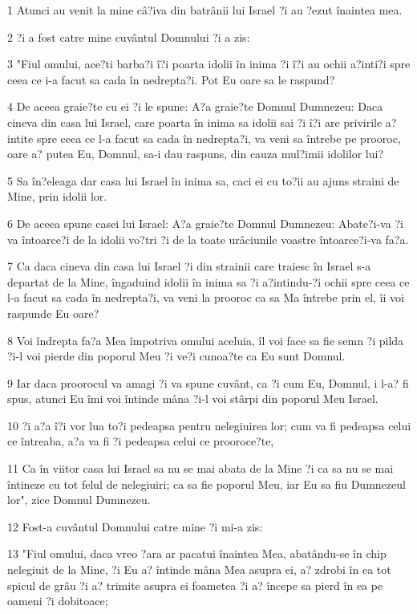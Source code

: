 \par 1 Atunci au venit la mine câ?iva din batrânii lui Israel ?i au ?ezut înaintea mea.
\par 2 ?i a fost catre mine cuvântul Domnului ?i a zis:
\par 3 "Fiul omului, ace?ti barba?i î?i poarta idolii în inima ?i î?i au ochii a?inti?i spre ceea ce i-a facut sa cada în nedrepta?i. Pot Eu oare sa le raspund?
\par 4 De aceea graie?te cu ei ?i le spune: A?a graie?te Domnul Dumnezeu: Daca cineva din casa lui Israel, care poarta în inima sa idolii sai ?i î?i are privirile a?intite spre ceea ce l-a facut sa cada în nedrepta?i, va veni sa întrebe pe prooroc, oare a? putea Eu, Domnul, sa-i dau raspuns, din cauza mul?imii idolilor lui?
\par 5 Sa în?eleaga dar casa lui Israel în inima sa, caci ei cu to?ii au ajuns straini de Mine, prin idolii lor.
\par 6 De aceea spune casei lui Israel: A?a graie?te Domnul Dumnezeu: Abate?i-va ?i va întoarce?i de la idolii vo?tri ?i de la toate urâciunile voastre întoarce?i-va fa?a.
\par 7 Ca daca cineva din casa lui Israel ?i din strainii care traiesc în Israel s-a departat de la Mine, îngaduind idolii în inima sa ?i a?intindu-?i ochii spre ceea ce l-a facut sa cada în nedrepta?i, va veni la prooroc ca sa Ma întrebe prin el, îi voi raspunde Eu oare?
\par 8 Voi îndrepta fa?a Mea împotriva omului aceluia, îl voi face sa fie semn ?i pilda ?i-l voi pierde din poporul Meu ?i ve?i cunoa?te ca Eu sunt Domnul.
\par 9 Iar daca proorocul va amagi ?i va spune cuvânt, ca ?i cum Eu, Domnul, i l-a? fi spus, atunci Eu îmi voi întinde mâna ?i-l voi stârpi din poporul Meu Israel.
\par 10 ?i a?a î?i vor lua to?i pedeapsa pentru nelegiuirea lor; cum va fi pedeapsa celui ce întreaba, a?a va fi ?i pedeapsa celui ce prooroce?te,
\par 11 Ca în viitor casa lui Israel sa nu se mai abata de la Mine ?i ca sa nu se mai întineze cu tot felul de nelegiuiri; ca sa fie poporul Meu, iar Eu sa fiu Dumnezeul lor", zice Domnul Dumnezeu.
\par 12 Fost-a cuvântul Domnului catre mine ?i mi-a zis:
\par 13 "Fiul omului, daca vreo ?ara ar pacatui înaintea Mea, abatându-se în chip nelegiuit de la Mine, ?i Eu a? întinde mâna Mea asupra ei, a? zdrobi în ea tot spicul de grâu ?i a? trimite asupra ei foametea ?i a? începe sa pierd în ea pe oameni ?i dobitoace;
